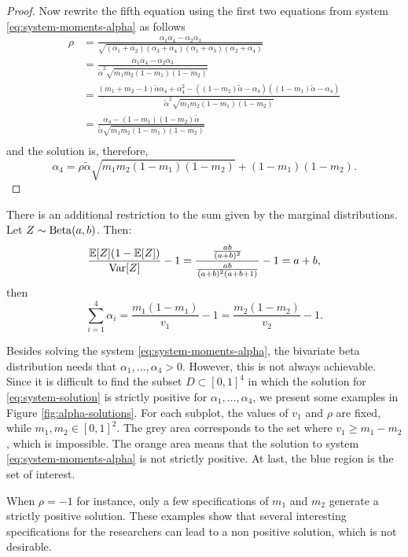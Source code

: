 \begin{proof}
Now rewrite the fifth equation using the first two equations from system \eqref{eq:system-moments-alpha} as follows 
\begin{equation}
    \label{eq:rho-equation}
    \begin{split}
        \rho &= \frac{\alpha_1\alpha_4 - \alpha_2\alpha_3}{\sqrt{(\alpha_1+\alpha_2)(\alpha_3+\alpha_4)(\alpha_1+\alpha_3)(\alpha_2+\alpha_4)}} \\ 
        &= \frac{\alpha_1\alpha_4 - \alpha_2\alpha_3}{\tilde{\alpha}^2\sqrt{m_1m_2(1-m_1)(1-m_2)}} \\ 
        &= \frac{(m_1 + m_2 - 1)\tilde{\alpha}\alpha_4 + \alpha_4^2 - ((1-m_2)\tilde{\alpha} - \alpha_4)((1-m_1)\tilde{\alpha} - \alpha_4)}{\tilde{\alpha}^2\sqrt{m_1m_2(1-m_1)(1-m_2)}} \\
        &= \frac{\alpha_4 - (1-m_1)(1-m_2)\tilde{\alpha}}{\tilde{\alpha}\sqrt{m_1m_2(1-m_1)(1-m_2)}} \\ 
    \end{split}
\end{equation}
and the solution is, therefore, 
$$
\alpha_4 = \rho\tilde{\alpha}\sqrt{m_1m_2(1-m_1)(1-m_2)} + (1-m_1)(1-m_2).
$$
\end{proof}

There is an additional restriction to the sum given by the marginal
distributions. Let $Z \sim \operatorname{Beta}(a, b)$. Then: 
$$
\frac{\mathbb{E}[Z](1-\mathbb{E}[Z])}{\operatorname{Var}[Z]} - 1 = \frac{\frac{ab}{(a+b)^2}}{\frac{ab}{(a+b)^2(a+b+1)}}-1 = a+b, 
$$
then 
\begin{equation}
  \label{eq:restriction-sum-alphas}
  \sum_{i=1}^4 \alpha_i = \frac{m_1(1-m_1)}{v_1} - 1 = \frac{m_2(1-m_2)}{v_2} - 1.
\end{equation}

Besides solving the system \eqref{eq:system-moments-alpha}, the bivariate 
beta distribution needs that $\alpha_1, \dots, \alpha_4 > 0$. However, this is
not always achievable. Since it is difficult to find the subset $D \subset [0,1]^4$ in
which
the solution for \eqref{eq:system-solution} is strictly positive for
$\alpha_1, \dots, \alpha_4$, we present some examples in Figure
\ref{fig:alpha-solutions}. For each subplot, the values of $v_1$ and $\rho$
are fixed, while $m_1, m_2 \in [0,1]^2$. The grey area corresponds to the set 
where $v_1 \ge m_1 - m_2$, which is impossible. The orange area means that
the solution to system \eqref{eq:system-moments-alpha} is not strictly
positive. At last, the blue region is the set of interest. 

When $\rho = -1$ for instance, only a few specifications of $m_1$ and $m_2$
generate a strictly positive solution. These examples show that several
interesting specifications for the researchers can lead to a non positive
solution, which is not desirable. 


